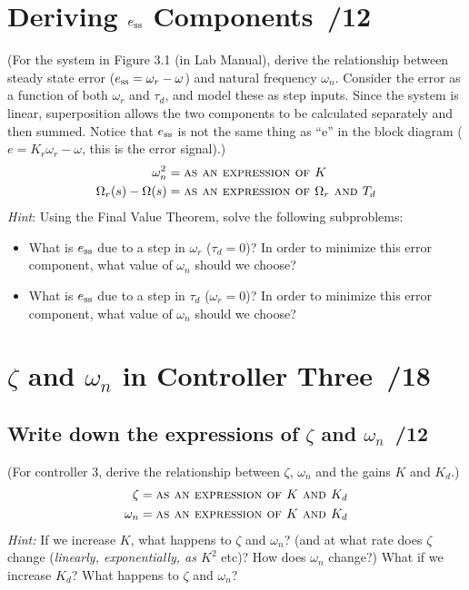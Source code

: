 \documentclass{article}
\newcommand{\score}{\hfill \underline{\hspace{0.65cm}}\,/} %
\begin{document}
\section{{\sc Deriving $e_{\rm ss}$ Components} \score 12}
(For the system in Figure 3.1 (in Lab Manual), derive the relationship between steady state error ($e_{\rm ss}= \omega_r - \omega$) and natural frequency $\omega_n$. Consider the error as a function of both $\omega_r$ and $\tau_d$, and model these as step inputs. Since the system is linear, superposition allows the two components to be calculated separately and then summed. Notice that $e_{\rm ss}$ is not the same thing as ``e'' in the block diagram ($e= K_r\omega_r - \omega$, this is the error signal).)
\begin{align*}
  \omega_n^2 & = \mbox{\sc as an expression of $K$} \\
  \Omega_r(s) - \Omega(s) & = \mbox{\sc as an expression of $\Omega_r$ and $T_d$}
\end{align*}
\emph{Hint}: Using the Final Value Theorem, solve the following subproblems:
\begin{itemize}
\item What is $e_{\rm ss}$ due to a step in $\omega_r$ ($\tau_d = 0$)? In order to minimize this error component, what value of $\omega_n$ should we choose?
\item What is $e_{\rm ss}$ due to a step in $\tau_d$ ($\omega_r = 0$)? In order to minimize this error component, what value of $\omega_n$ should we choose?
\end{itemize}

\section{{\sc $\zeta$ and $\omega_n$ in Controller Three} \score 18}
\subsection{Write down the expressions of $\zeta$ and $\omega_n$ \score 12}
(For controller 3, derive the relationship between $\zeta$, $\omega_n$ and the gains $K$ and $K_d$.)
\begin{align*}
\zeta & = \mbox{\sc as an expression of $K$ and $K_d$} \\  
\omega_n & = \mbox{\sc as an expression of $K$ and $K_d$}  
\end{align*}
\emph{Hint:} If we increase $K$, what happens to $\zeta$ and $\omega_n$? (and at what rate does $\zeta$ change (\emph{linearly, exponentially, as $K^2$} etc)? How does $\omega_n$ change?) What if we increase $K_d$? What happens to $\zeta$ and $\omega_n$?
\end{document}
